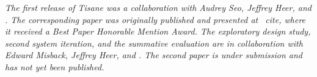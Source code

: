 

\textit{The first release of Tisane was a collaboration with Audrey Seo, Jeffrey
Heer, and \reneJust. The corresponding paper was originally published and presented at
~cite{}, where it received a \textit{Best Paper Honorable
Mention Award}. The exploratory design study, second system iteration, and the
summative evaluation are in collaboration with Edward Misback, Jeffrey Heer, and
\reneJust. The second paper is under submission and has not yet been published.}